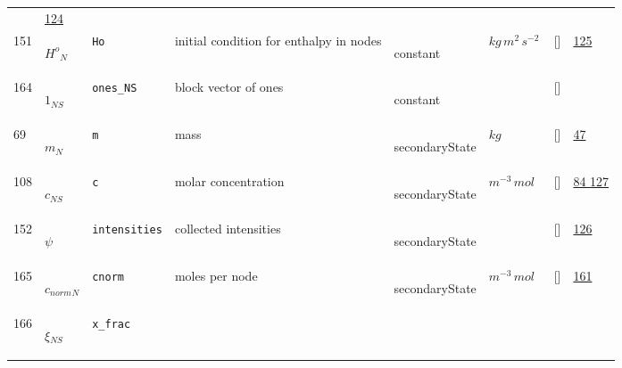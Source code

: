 \begin{longtable}{|p{1cm}|p{3cm}|p{3cm}|p{7cm}|p{3.0cm}|p{3cm}|p{2cm}|p{1cm}|}
             & \hyperlink{"e:124"}{ 124 }
                 \\
    151
             & \hypertarget{"v:151"}{ $ {{H^o}}{_{N}} $}
             & \verb|Ho|
             & initial condition for enthalpy in nodes
             & \begin{lay}constant \end{lay}
             & $ kg \,m^{2} \,s^{-2} \, $
             & []
             & \hyperlink{"e:125"}{ 125 }
                 \\
    164
             & \hypertarget{"v:164"}{ $ {1}{_{{N S}}} $}
             & \verb|ones_NS|
             & block vector of ones
             & \begin{lay}constant \end{lay}
             & $  $
             & []
             & \\
    69
             & \hypertarget{"v:69"}{ $ {m}{_{N}} $}
             & \verb|m|
             & mass
             & \begin{lay}secondaryState \end{lay}
             & $ kg \, $
             & []
             & \hyperlink{"e:47"}{ 47 }
                 \\
    108
             & \hypertarget{"v:108"}{ $ {c}{_{{N S}}} $}
             & \verb|c|
             & molar concentration
             & \begin{lay}secondaryState \end{lay}
             & $ m^{-3} \,mol \, $
             & []
             & \hyperlink{"e:84"}{ 84 }
                 \hyperlink{"e:127"}{ 127 }
                 \\
    152
             & \hypertarget{"v:152"}{ $ {\psi}{_{}} $}
             & \verb|intensities|
             & collected intensities
             & \begin{lay}secondaryState \end{lay}
             & $  $
             & []
             & \hyperlink{"e:126"}{ 126 }
                 \\
    165
             & \hypertarget{"v:165"}{ $ {c_{norm}}{_{N}} $}
             & \verb|cnorm|
             & moles per node
             & \begin{lay}secondaryState \end{lay}
             & $ m^{-3} \,mol \, $
             & []
             & \hyperlink{"e:161"}{ 161 }
                 \\
    166
             & \hypertarget{"v:166"}{ $ {\xi}{_{{N S}}} $}
             & \verb|x_frac|

\end{longtable}
